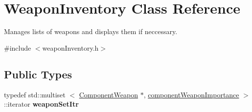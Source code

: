 \hypertarget{classWeaponInventory}{
\section{\-Weapon\-Inventory \-Class \-Reference}
\label{d8/da9/classWeaponInventory}
}


\-Manages lists of weapons and displays them if neccessary.  




{\ttfamily \#include $<$weapon\-Inventory.\-h$>$}

\subsection*{\-Public \-Types}
\begin{DoxyCompactItemize}
\item 
\hypertarget{classWeaponInventory_a9f331e48ebdcfdcedb5a61fafcdb1cf9}{
typedef std\-::multiset\*
$<$ \hyperlink{classComponentWeapon}{\-Component\-Weapon} \*
$\ast$, \hyperlink{structcomponentWeaponImportance}{component\-Weapon\-Importance} $>$\*
\-::iterator {\bfseries weapon\-Set\-Itr}}
\label{d8/da9/classWeaponInventory_a9f331e48ebdcfdcedb5a61fafcdb1cf9}

\end{DoxyCompactItemize}
